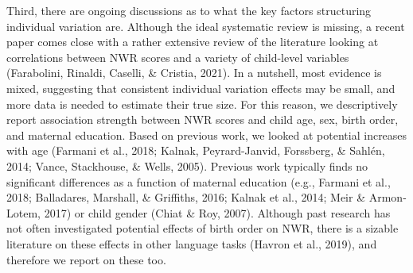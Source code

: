 \documentclass[english,,man,floatsintext]{apa6}
\begin{document}
Third, there are ongoing discussions as to what the key factors structuring individual variation are. Although the ideal systematic review is missing, a recent paper comes close with a rather extensive review of the literature looking at correlations between NWR scores and a variety of child-level variables (Farabolini, Rinaldi, Caselli, \& Cristia, 2021). In a nutshell, most evidence is mixed, suggesting that consistent individual variation effects may be small, and more data is needed to estimate their true size. For this reason, we descriptively report association strength between NWR scores and child age, sex, birth order, and maternal education. Based on previous work, we looked at potential increases with age (Farmani et al., 2018; Kalnak, Peyrard-Janvid, Forssberg, \& Sahlén, 2014; Vance, Stackhouse, \& Wells, 2005). Previous work typically finds no significant differences as a function of maternal education (e.g., Farmani et al., 2018; Balladares, Marshall, \& Griffiths, 2016; Kalnak et al., 2014; Meir \& Armon-Lotem, 2017) or child gender (Chiat \& Roy, 2007). Although past research has not often investigated potential effects of birth order on NWR, there is a sizable literature on these effects in other language tasks (Havron et al., 2019), and therefore we report on these too.
\end{document}
